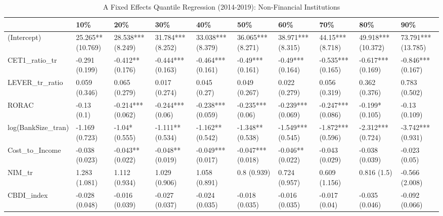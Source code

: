\begin{table}[ht]
\centering
\caption{A Fixed Effects Quantile Regression (2014-2019): Non-Financial Institutions} 
\begingroup\small
\begin{tabular}{llllllllll}
  \toprule
 & 10\% & 20\% & 30\% & 40\% & 50\% & 60\% & 70\% & 80\% & 90\% \\ 
  \midrule
(Intercept) & 25.265** (10.769) & 28.538*** (8.249) & 31.784*** (8.252) & 33.038*** (8.379) & 36.065*** (8.271) & 38.971*** (8.315) & 44.15*** (8.718) & 49.918*** (10.372) & 73.791*** (13.785) \\ 
  CET1\_ratio\_tr & -0.291 (0.199) & -0.412** (0.176) & -0.444*** (0.163) & -0.464*** (0.161) & -0.49*** (0.161) & -0.49*** (0.164) & -0.535*** (0.165) & -0.617*** (0.169) & -0.846*** (0.167) \\ 
  LEVER\_tr\_ratio & 0.059 (0.346) & 0.065 (0.279) & 0.017 (0.274) & 0.045 (0.27) & 0.049 (0.267) & 0.022 (0.279) & 0.056 (0.319) & 0.362 (0.376) & 0.783 (0.502) \\ 
  RORAC & -0.13 (0.1) & -0.214*** (0.062) & -0.244*** (0.06) & -0.238*** (0.059) & -0.235*** (0.06) & -0.239*** (0.069) & -0.247*** (0.086) & -0.199* (0.105) & -0.13 (0.109) \\ 
  log(BankSize\_tran) & -1.169 (0.723) & -1.04* (0.555) & -1.111** (0.534) & -1.162** (0.542) & -1.348** (0.538) & -1.549*** (0.545) & -1.872*** (0.596) & -2.312*** (0.724) & -3.742*** (0.931) \\ 
  Cost\_to\_Income & -0.038 (0.023) & -0.043** (0.022) & -0.048** (0.019) & -0.049*** (0.017) & -0.047*** (0.018) & -0.046** (0.022) & -0.043 (0.029) & -0.038 (0.039) & -0.023 (0.05) \\ 
  NIM\_tr & 1.283 (1.081) & 1.112 (0.934) & 1.029 (0.906) & 1.058 (0.891) & 0.8 (0.939) & 0.724 (0.957) & 0.609 (1.156) & 0.816 (1.5) & -0.566 (2.008) \\ 
  CBDI\_index & -0.028 (0.048) & -0.016 (0.039) & -0.027 (0.037) & -0.024 (0.035) & -0.018 (0.035) & -0.016 (0.035) & -0.017 (0.04) & -0.035 (0.046) & -0.092 (0.066) \\ 
   \bottomrule
\end{tabular}
\endgroup
\end{table}
